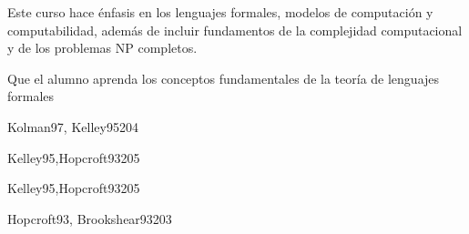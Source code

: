 \begin{syllabus}


\begin{justification}
Este curso hace énfasis en los lenguajes formales, modelos de
computación y computabilidad, además de incluir fundamentos de la
complejidad computacional y de los problemas NP completos.
\end{justification}

\begin{goals}
\item Que el alumno aprenda los conceptos fundamentales de la teoría de lenguajes formales
\end{goals}

\begin{outcomes}
\end{outcomes}

\begin{unit}{\ALBasicComputabilityDef}{Kolman97, Kelley95}{20}{4}
    \ALBasicComputabilityAllTopics
    \ALBasicComputabilityAllObjectives
\end{unit}

\begin{unit}{\ALPversusNPDef}{Kelley95,Hopcroft93}{20}{5}
    \ALPversusNPAllTopics
    \ALPversusNPAllObjectives
\end{unit}

\begin{unit}{\ALPversusNPDef}{Kelley95,Hopcroft93}{20}{5}
    \ALPversusNPAllTopics
    \ALPversusNPAllObjectives
\end{unit}

\begin{unit}{\ALAutomataTheoryDef}{Hopcroft93, Brookshear93}{20}{3}
   \ALAutomataTheoryAllTopics
   \ALAutomataTheoryAllObjectives
\end{unit}



\begin{coursebibliography}
\end{coursebibliography}

\end{syllabus}

%
